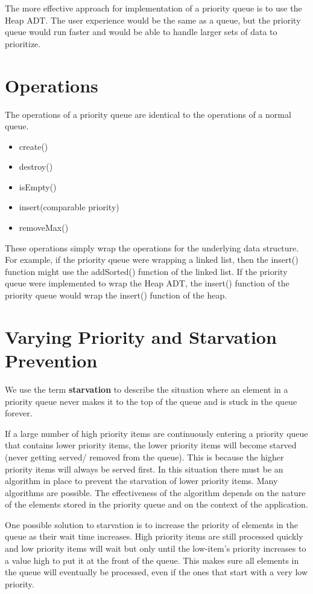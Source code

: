 The more effective approach for implementation of a priority queue is to use the Heap ADT.  The user experience would be the same as a queue, but the priority queue would run faster and would be able to handle larger sets of data to prioritize. 

\section{Operations}
The operations of a priority queue are identical to the operations of a normal queue.
\begin{itemize}
\item create()
\item destroy()
\item isEmpty()
\item insert(comparable priority)
\item removeMax()
\end{itemize}

These operations simply wrap the operations for the underlying data structure.  For example, if the priority queue were wrapping a linked list,  then the insert() function might use the addSorted() function of the linked list.   If the priority queue were implemented to wrap the Heap ADT,  the insert() function of the priority queue would wrap the insert() function of the heap.


\section{Varying Priority and Starvation Prevention}
We use the term \textbf{starvation} to describe the situation where an element in a priority queue never makes it to the top of the queue and is stuck in the queue forever.  

If a large number of high priority items are continuously entering a priority queue that contains lower priority items, the lower priority items will become starved (never getting served/ removed from the queue). This is because the higher priority items will always be served first.  In this situation there must be an algorithm in place to prevent the starvation of lower priority items.  Many algorithms are possible.  The effectiveness of the algorithm depends on the nature of the elements stored in the priority queue and on the context of the application.

One possible solution to starvation is to increase the priority of elements in the queue as their wait time increases.  High priority items are still processed quickly and low priority items will wait but only until the low-item's  priority increases to a value high to put it at the front of the queue. This makes sure all elements in the queue will eventually be processed, even if the ones that start  with a very low priority.

